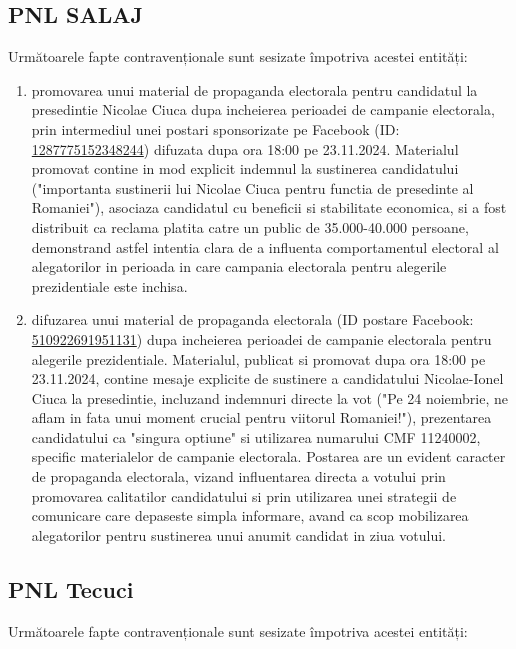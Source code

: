 \documentclass[a4paper,12pt]{article}
\begin{document}
\vspace{0.5cm}

\subsection{PNL SALAJ}
Următoarele fapte contravenționale sunt sesizate împotriva acestei entități:

\begin{enumerate}[leftmargin=*, label=\arabic*.)]
    \item promovarea unui material de propaganda electorala pentru candidatul la presedintie Nicolae Ciuca dupa incheierea perioadei de campanie electorala, prin intermediul unei postari sponsorizate pe Facebook (ID: \href{https://www.facebook.com/ads/library/?id=1287775152348244}{1287775152348244}) difuzata dupa ora 18:00 pe 23.11.2024. Materialul promovat contine in mod explicit indemnul la sustinerea candidatului ("importanta sustinerii lui Nicolae Ciuca pentru functia de presedinte al Romaniei"), asociaza candidatul cu beneficii si stabilitate economica, si a fost distribuit ca reclama platita catre un public de 35.000-40.000 persoane, demonstrand astfel intentia clara de a influenta comportamentul electoral al alegatorilor in perioada in care campania electorala pentru alegerile prezidentiale este inchisa.
    \item difuzarea unui material de propaganda electorala (ID postare Facebook: \href{https://www.facebook.com/ads/library/?id=510922691951131}{510922691951131}) dupa incheierea perioadei de campanie electorala pentru alegerile prezidentiale. Materialul, publicat si promovat dupa ora 18:00 pe 23.11.2024, contine mesaje explicite de sustinere a candidatului Nicolae-Ionel Ciuca la presedintie, incluzand indemnuri directe la vot ("Pe 24 noiembrie, ne aflam in fata unui moment crucial pentru viitorul Romaniei!"), prezentarea candidatului ca "singura optiune" si utilizarea numarului CMF 11240002, specific materialelor de campanie electorala. Postarea are un evident caracter de propaganda electorala, vizand influentarea directa a votului prin promovarea calitatilor candidatului si prin utilizarea unei strategii de comunicare care depaseste simpla informare, avand ca scop mobilizarea alegatorilor pentru sustinerea unui anumit candidat in ziua votului.
\end{enumerate}

\vspace{0.5cm}

\subsection{PNL Tecuci}
Următoarele fapte contravenționale sunt sesizate împotriva acestei entități:
\end{document}
